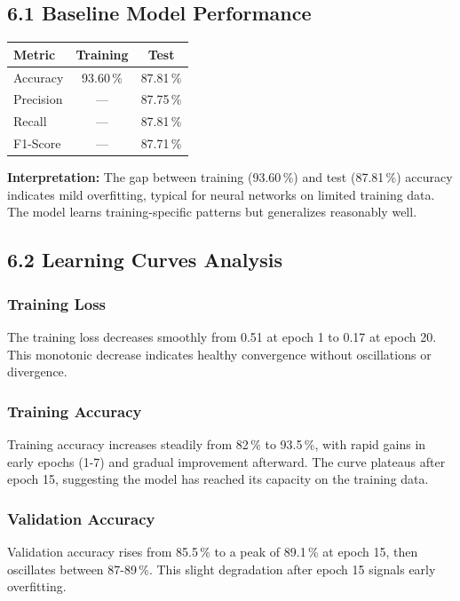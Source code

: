 \documentclass[11pt]{article}
\begin{document}
\subsection*{6.1 Baseline Model Performance}

\begin{center}
\begin{tabular}{|l|c|c|}
\hline
\textbf{Metric} & \textbf{Training} & \textbf{Test}\\
\hline
Accuracy & 93.60\,\% & 87.81\,\%\\
\hline
Precision & --- & 87.75\,\%\\
\hline
Recall & --- & 87.81\,\%\\
\hline
F1-Score & --- & 87.71\,\%\\
\hline
\end{tabular}
\end{center}

\textbf{Interpretation:} The gap between training (93.60\,\%) and test (87.81\,\%) accuracy indicates mild overfitting, typical for neural networks on limited training data. The model learns training-specific patterns but generalizes reasonably well.

\subsection*{6.2 Learning Curves Analysis}

\subsubsection*{Training Loss}
The training loss decreases smoothly from 0.51 at epoch 1 to 0.17 at epoch 20. This monotonic decrease indicates healthy convergence without oscillations or divergence.

\subsubsection*{Training Accuracy}
Training accuracy increases steadily from 82\,\% to 93.5\,\%, with rapid gains in early epochs (1-7) and gradual improvement afterward. The curve plateaus after epoch 15, suggesting the model has reached its capacity on the training data.

\subsubsection*{Validation Accuracy}
Validation accuracy rises from 85.5\,\% to a peak of 89.1\,\% at epoch 15, then oscillates between 87-89\,\%. This slight degradation after epoch 15 signals early overfitting.
\end{document}
